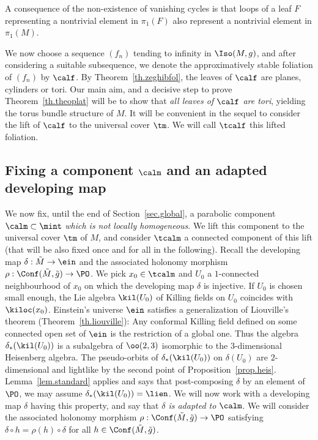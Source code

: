 A consequence of the non-existence of vanishing cycles is that loops of a leaf $F$ representing a nontrivial element in $\pi_1(F)$ also represent a nontrivial element in $\pi_1(M)$.



We now choose a sequence $(f_n)$ tending to infinity in $\Iso(M,g)$, and after considering a suitable subsequence, we denote the approximatively stable foliation of $(f_n)$ by $\calf$. By Theorem~\ref{th.zeghibfol}, the leaves of $\calf$ are planes, cylinders or tori. Our main aim, and a decisive step to prove Theorem~\ref{th.theoplat} will be to show that \emph{all leaves of $\calf$ are tori}, yielding the torus bundle structure of $M$. It will be convenient in the sequel to consider the lift of $\calf$ to the universal cover $\tm$. We will call $\tcalf$ this lifted foliation.



\subsection{Fixing a component \texorpdfstring{$\calm$}{calm} and an adapted developing map}\label{sec.adapted}
We now fix, until the end of Section~\ref{sec.global}, a parabolic component $\calm \subset \mint$ \emph{which is not locally homogeneous}. We lift this component to the universal cover $\tm$ of $M$, and consider $\tcalm$ a connected component of this lift (that will be also fixed once and for all in the following). Recall the developing map $\delta: \tilde{M} \to \ein$ and the associated holonomy morphism $\rho: \Conf(\tilde{M}, \tilde{g}) \to \PO$. We pick $x_0 \in \tcalm$ and $U_0$ a $1$-connected neighbourhood of $x_0$ on which the developing map $\delta$ is injective. If $U_0$ is chosen small enough, the Lie algebra $\kil(U_0)$ of Killing fields on $U_0$ coincides with $\kiloc(x_0)$. Einstein's universe $\ein$ satisfies a generalization of Liouville's theorem (Theorem~\ref{th.liouville}): Any conformal Killing field defined on some connected open set of $\ein$ is the restriction of a global one. Thus the algebra $\delta_*(\kil(U_0))$ is a subalgebra of $\oo(2,3)$ isomorphic to the $3$-dimensional Heisenberg algebra. The pseudo-orbits of $\delta_*(\kil(U_0))$ on $\delta(U_0)$ are $2$-dimensional and lightlike by the second point of Proposition~\ref{prop.heis}. Lemma~\ref{lem.standard} applies and says that post-composing $\delta$ by an element of $\PO$, we may assume $\delta_*(\kil(U_0))=\lien$. We will now work with a developing map $\delta$ having this property, and say that \emph{$\delta$ is adapted to $\calm$}. We will consider the associated holonomy morphism $\rho: \Conf(\tilde{M}, \tilde{g}) \to \PO$ satisfying $\delta \circ h = \rho(h) \circ \delta$ for all $h \in \Conf(\tilde{M}, \tilde{g})$.

